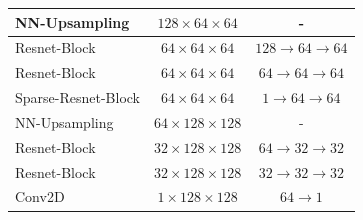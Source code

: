 \begin{table}[h]
\begin{tabular}{l c c}
\small{NN-Upsampling} & \small{$128 \times 64 \times 64$} & - \\
\midrule
\small{Resnet-Block} & \small{$64 \times 64 \times 64$} & \small{$128 \rightarrow 64 \rightarrow 64$} \\
\small{Resnet-Block} & \small{$64 \times 64 \times 64$} & \small{$64 \rightarrow 64 \rightarrow 64$} \\
\small{Sparse-Resnet-Block} & \small{$64 \times 64 \times 64$} & \small{$1 \rightarrow 64 \rightarrow 64$} \\
\small{NN-Upsampling} & \small{$64 \times 128 \times 128$} & - \\
\midrule
\small{Resnet-Block} & \small{$32 \times 128 \times 128$} & \small{$64 \rightarrow 32 \rightarrow 32$} \\
\small{Resnet-Block} & \small{$32 \times 128 \times 128$} & \small{$32 \rightarrow 32 \rightarrow 32$} \\
\small{Conv2D} & \small{$1 \times 128 \times 128$} & \small{$ 64 \rightarrow 1$} \\
\bottomrule %
\end{tabular}
\label{table:G_S} %
\end{table}


